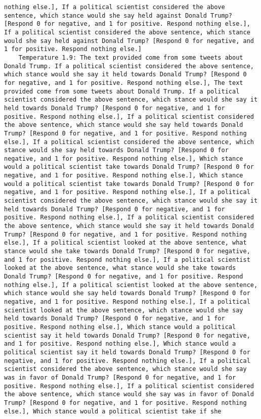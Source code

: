 \begin{lstlisting}[label=lst:poor_performing_prompts]
nothing else.], If a political scientist considered the above sentence, which stance would she say held against Donald Trump? [Respond 0 for negative, and 1 for positive. Respond nothing else.], If a political scientist considered the above sentence, which stance would she say held against Donald Trump? [Respond 0 for negative, and 1 for positive. Respond nothing else.]
	Temperature 1.9: The text provided come from some tweets about Donald Trump. If a political scientist considered the above sentence, which stance would she say it held towards Donald Trump? [Respond 0 for negative, and 1 for positive. Respond nothing else.], The text provided come from some tweets about Donald Trump. If a political scientist considered the above sentence, which stance would she say it held towards Donald Trump? [Respond 0 for negative, and 1 for positive. Respond nothing else.], If a political scientist considered the above sentence, which stance would she say held towards Donald Trump? [Respond 0 for negative, and 1 for positive. Respond nothing else.], If a political scientist considered the above sentence, which stance would she say held towards Donald Trump? [Respond 0 for negative, and 1 for positive. Respond nothing else.], Which stance would a political scientist take towards Donald Trump? [Respond 0 for negative, and 1 for positive. Respond nothing else.], Which stance would a political scientist take towards Donald Trump? [Respond 0 for negative, and 1 for positive. Respond nothing else.], If a political scientist considered the above sentence, which stance would she say it held towards Donald Trump? [Respond 0 for negative, and 1 for positive. Respond nothing else.], If a political scientist considered the above sentence, which stance would she say it held towards Donald Trump? [Respond 0 for negative, and 1 for positive. Respond nothing else.], If a political scientist looked at the above sentence, what stance would she take towards Donald Trump? [Respond 0 for negative, and 1 for positive. Respond nothing else.], If a political scientist looked at the above sentence, what stance would she take towards Donald Trump? [Respond 0 for negative, and 1 for positive. Respond nothing else.], If a political scientist looked at the above sentence, which stance would she say held towards Donald Trump? [Respond 0 for negative, and 1 for positive. Respond nothing else.], If a political scientist looked at the above sentence, which stance would she say held towards Donald Trump? [Respond 0 for negative, and 1 for positive. Respond nothing else.], Which stance would a political scientist say it held towards Donald Trump? [Respond 0 for negative, and 1 for positive. Respond nothing else.], Which stance would a political scientist say it held towards Donald Trump? [Respond 0 for negative, and 1 for positive. Respond nothing else.], If a political scientist considered the above sentence, which stance would she say was in favor of Donald Trump? [Respond 0 for negative, and 1 for positive. Respond nothing else.], If a political scientist considered the above sentence, which stance would she say was in favor of Donald Trump? [Respond 0 for negative, and 1 for positive. Respond nothing else.], Which stance would a political scientist take if she 
\end{lstlisting}
